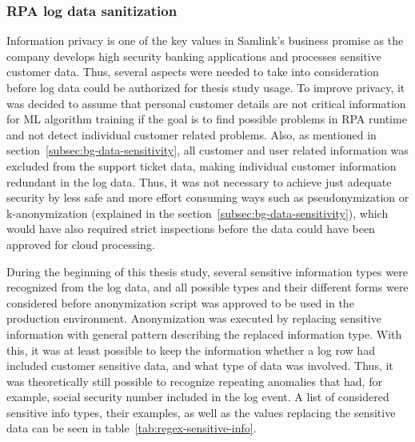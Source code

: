 \subsubsection*{RPA log data sanitization}
Information privacy is one of the key values in Samlink's business promise
as the company develops high security banking applications
and processes sensitive customer data.
Thus, several aspects were needed to take into consideration
before log data could be authorized for thesis study usage.
To improve privacy,
it was decided to assume
that personal customer details are not critical information
for ML algorithm training
if the goal is to find possible problems in RPA runtime
and not detect individual customer related problems.
Also,
as mentioned in section~\ref{subsec:bg-data-sensitivity},
all customer and user related information was excluded from the support ticket data,
making individual customer information redundant in the log data.
Thus,
it was not necessary to achieve just adequate security
by less safe and more effort consuming ways
such as pseudonymization or k-anonymization
(explained in the section~\ref{subsec:bg-data-sensitivity}),
which would have also required strict inspections
before the data could have been approved for cloud processing.

During the beginning of this thesis study,
several sensitive information types were recognized from the log data,
and all possible types and their different forms were considered
before anonymization script was approved to be used in the production environment.
Anonymization was executed by replacing sensitive information
with general pattern describing the replaced information type.
With this,
it was at least possible to keep the information
whether a log row had included customer sensitive data,
and what type of data was involved.
Thus,
it was theoretically still possible to recognize repeating anomalies
that had, for example,
social security number included in the log event.
A list of considered sensitive info types, their examples,
as well as the values replacing the sensitive data
can be seen in table~\ref{tab:regex-sensitive-info}.

